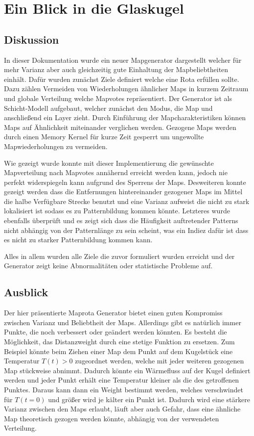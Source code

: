 \section{Ein Blick in die Glaskugel}
    \subsection{Diskussion}
    	In dieser Dokumentation wurde ein neuer Mapgenerator dargestellt welcher für mehr Varianz aber auch gleichzeitig gute Einhaltung der Mapbeliebtheiten einhält.
        Dafür wurden zunächst Ziele definiert welche eine Rota erfüllen sollte. 
        Dazu zählen Vermeiden von Wiederholungen ähnlicher Maps in kurzem Zeitraum und globale Verteilung welche Mapvotes repräsentiert.
        Der Generator ist als Schicht-Modell aufgebaut, welcher zunächst den Modus, die Map und anschließend ein Layer zieht. 
        Durch Einführung der Mapcharakteristiken können Maps auf Ähnlichkeit miteinander verglichen werden.
        Gezogene Maps werden durch einen Memory Kernel für kurze Zeit gesperrt um ungewollte Mapwiederholungen zu vermeiden.
        
        Wie gezeigt wurde konnte mit dieser Implementierung die gewünschte Mapverteilung nach Mapvotes annähernd erreicht werden kann, jedoch nie perfekt widerspiegeln kann aufgrund des Sperrens der Maps.
        Desweiteren konnte gezeigt werden dass die Entfernungen hintereinander gezogener Maps im Mittel die halbe Verfügbare Strecke benutzt und eine Varianz aufweist die nicht zu stark lokalisiert ist sodass es zu Patternbildung kommen könnte.
        Letzteres wurde ebenfalls überprüft und es zeigt sich dass die Häufigkeit auftretender Patterns nicht abhängig von der Patternlänge zu sein scheint, was ein Indiez dafür ist dass es nicht zu starker Patternbildung kommen kann. 

        Alles in allem wurden alle Ziele die zuvor formuliert wurden erreicht und der Generator zeigt keine Abnormalitäten oder statistische Probleme auf.

    \subsection{Ausblick}
        Der hier präsentierte Maprota Generator bietet einen guten Kompromiss zwischen Varianz und Beliebtheit der Maps. 
        Allerdings gibt es natürlich immer Punkte, die noch verbessert oder geändert werden könnten.
        Es besteht die Möglichkeit, das Distanzweight durch eine stetige Funktion zu ersetzen. 
        Zum Beispiel könnte beim Ziehen einer Map dem Punkt auf dem Kugelstück eine Temperatur $T(t)>0$ zugeordnet werden,
        welche mit jeder weiteren gezogenen Map stückweise abnimmt.
        Dadurch könnte ein Wärmefluss auf der Kugel definiert werden und jeder Punkt erhält eine Temperatur kleiner als die des getroffenen Punktes. 
        Daraus kann dann ein Weight bestimmt werden, 
        welches verschwindet für $T(t=0)$ und größer wird je \glqq{}kälter\grqq{} ein Punkt ist. 
        Dadurch wird eine stärkere Varianz zwischen den Maps erlaubt, 
        läuft aber auch Gefahr, dass eine ähnliche Map theoretisch gezogen werden könnte, abhängig von der verwendeten Verteilung.
        
